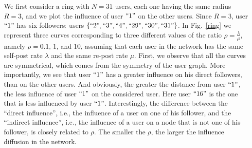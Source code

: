 \documentclass[10pt, conference, letterpaper]{IEEEtran}
\begin{document}
{We first consider a ring with $N=31$ users, each one having the same radius $R=3$, and we plot the influence of user $``1"$ on the other users. Since $R=3$, user $``1"$ has six followers: users $\left\{``2", ``3", ``4", ``29", ``30", ``31"\right\}$. In Fig.~\ref{ring} we represent three curves corresponding to three different values of the ratio $\rho=\frac{\lambda}{\mu}$, namely $\rho=0.1$, $1$, and $10$, assuming that each user in the network has the same self-post rate $\lambda$ and the same re-post rate $\mu$. First, we observe that all the curves are symmetrical, which comes from the symmetry of the user graph. More importantly, we see that user $``1"$ has a greater influence on his direct followers, than on the other users. And obviously, the greater the distance from user $``1"$, the less influence of user $``1"$ on the considered user. Here user $``16"$ is the one that is less influenced by user $``1"$. Interestingly, the difference between the ``direct influence'', i.e., the influence of a user on one of his follower, and the ``indirect influence'', i.e., the influence of a user on a node that is not one of his follower, is closely related to $\rho$. The smaller the $\rho$, the larger the influence diffusion in the network.

}
\end{document}
